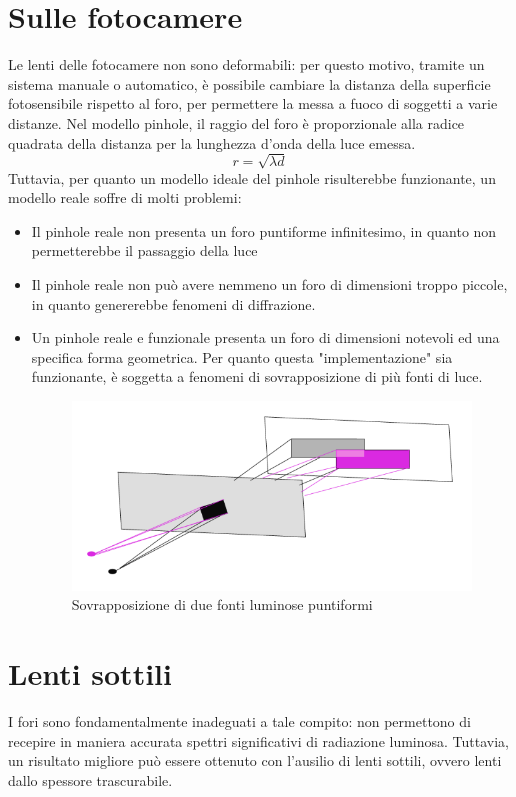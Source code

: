\documentclass{report}
\begin{document}
	\section{Sulle fotocamere}
	Le lenti delle fotocamere non sono deformabili: per questo motivo, tramite un sistema manuale o automatico, è possibile cambiare la distanza della superficie fotosensibile rispetto al foro, per permettere la messa a fuoco di soggetti a varie distanze.
	Nel modello pinhole, il raggio del foro è proporzionale alla radice quadrata della distanza per la lunghezza d'onda della luce emessa.
	$$
	r = \sqrt{\lambda d}
	$$
	Tuttavia, per quanto un modello ideale del pinhole risulterebbe funzionante, un modello reale soffre di molti problemi:
	\begin{itemize}
		\item Il pinhole reale non presenta un foro puntiforme infinitesimo, in quanto non permetterebbe il passaggio della luce
		\item Il pinhole reale non può avere nemmeno un foro di dimensioni troppo piccole, in quanto genererebbe fenomeni di diffrazione.
		\item Un pinhole reale e funzionale presenta un foro di dimensioni notevoli ed una specifica forma geometrica. Per quanto questa "implementazione" sia funzionante, è soggetta a fenomeni di sovrapposizione di più fonti di luce.
		      \begin{figure}[htp]
		      	\centering
		      	\includegraphics[width=0.75\linewidth]{sovrapposizione.png}
		      	\caption{Sovrapposizione di due fonti luminose puntiformi}
		      \end{figure}
	\end{itemize}
	
	\section{Lenti sottili}
	I fori sono fondamentalmente inadeguati a tale compito: non permettono di recepire in maniera accurata spettri significativi di radiazione luminosa.
	Tuttavia, un risultato migliore può essere ottenuto con l'ausilio di lenti sottili, ovvero lenti dallo spessore trascurabile.
\end{document}

